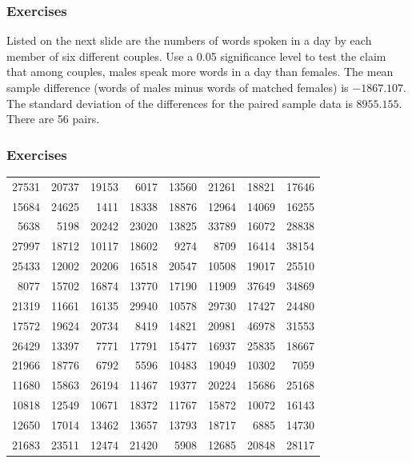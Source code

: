 \documentclass[xcolor=dvipsnames]{beamer}
\begin{document}
\begin{frame}
  \frametitle{Exercises}
  {\ubung} Listed on the next slide are the numbers
  of words spoken in a day by each member of six different couples.
  Use a 0.05 significance level to test the claim that among couples,
  males speak more words in a day than females. The mean sample
  difference (words of males minus words of matched females) is
  $-1867.107$. The standard deviation of the differences for the
  paired sample data is $8955.155$. There are 56 pairs.
\end{frame}

\begin{frame}
  \frametitle{Exercises}
\begin{tabular}{|rr|rr|rr|rr|}
27531 & 20737 & 19153 &  6017 & 13560 & 21261 & 18821 & 17646 \\
15684 & 24625 &  1411 & 18338 & 18876 & 12964 & 14069 & 16255 \\
 5638 &  5198 & 20242 & 23020 & 13825 & 33789 & 16072 & 28838 \\
27997 & 18712 & 10117 & 18602 &  9274 &  8709 & 16414 & 38154 \\
25433 & 12002 & 20206 & 16518 & 20547 & 10508 & 19017 & 25510 \\
 8077 & 15702 & 16874 & 13770 & 17190 & 11909 & 37649 & 34869 \\
21319 & 11661 & 16135 & 29940 & 10578 & 29730 & 17427 & 24480 \\
17572 & 19624 & 20734 &  8419 & 14821 & 20981 & 46978 & 31553 \\
26429 & 13397 &  7771 & 17791 & 15477 & 16937 & 25835 & 18667 \\
21966 & 18776 &  6792 &  5596 & 10483 & 19049 & 10302 &  7059 \\
11680 & 15863 & 26194 & 11467 & 19377 & 20224 & 15686 & 25168 \\
10818 & 12549 & 10671 & 18372 & 11767 & 15872 & 10072 & 16143 \\
12650 & 17014 & 13462 & 13657 & 13793 & 18717 &  6885 & 14730 \\
21683 & 23511 & 12474 & 21420 &  5908 & 12685 & 20848 & 28117 \\
\end{tabular}
\end{frame}

\end{document}
